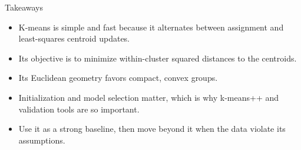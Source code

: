 \documentclass[aspectratio=169,11pt]{beamer}
\begin{document}
\begin{frame}[t]{Takeaways}
  \begin{itemize}
    \item K-means is simple and fast because it alternates between assignment and least-squares centroid updates.
    \item Its objective is to minimize within-cluster squared distances to the centroids.
    \item Its Euclidean geometry favors compact, convex groups.
    \item Initialization and model selection matter, which is why k-means++ and validation tools are so important.
    \item Use it as a strong baseline, then move beyond it when the data violate its assumptions.
  \end{itemize}
\end{frame}
\end{document}
